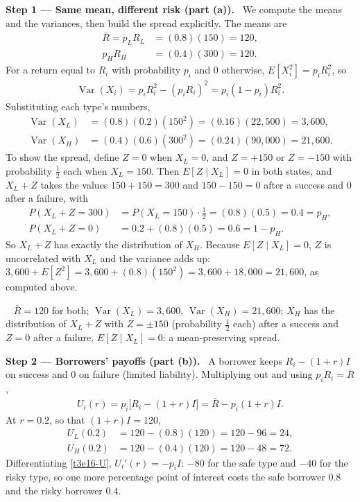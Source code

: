 \documentclass[11pt,a4paper]{article}
\newcommand{\step}[2]{\par\medskip\noindent\textbf{Step #1 --- #2.}~}
\newcommand{\answer}[1]{\par\smallskip\noindent\fbox{\textbf{Answer #1.}}~}
\begin{document}
\step{1}{Same mean, different risk (part (a))} We compute the means and the variances, then build the spread explicitly. The means are
\begin{align}
  \bar R = p_LR_L &= (0.8)(150) = 120, \nonumber\\
  p_HR_H &= (0.4)(300) = 120. \label{t3e16-mean}
\end{align}
For a return equal to $R_i$ with probability $p_i$ and 0 otherwise, $E[X_i^2]=p_iR_i^2$, so
\begin{align}
  \operatorname{Var}(X_i) = p_iR_i^2-(p_iR_i)^2 = p_i(1-p_i)R_i^2. \label{t3e16-var}
\end{align}
Substituting each type's numbers,
\begin{align}
  \operatorname{Var}(X_L) &= (0.8)(0.2)(150^2) = (0.16)(22{,}500) = 3{,}600, \nonumber\\
  \operatorname{Var}(X_H) &= (0.4)(0.6)(300^2) = (0.24)(90{,}000) = 21{,}600. \nonumber
\end{align}
To show the spread, define $Z=0$ when $X_L=0$, and $Z=+150$ or $Z=-150$ with probability $\tfrac12$ each when $X_L=150$. Then $E[Z\mid X_L]=0$ in both states, and $X_L+Z$ takes the values $150+150=300$ and $150-150=0$ after a success and $0$ after a failure, with
\begin{align}
  P(X_L+Z=300) &= P(X_L=150)\cdot\tfrac12 = (0.8)(0.5) = 0.4 = p_H, \nonumber\\
  P(X_L+Z=0) &= 0.2+(0.8)(0.5) = 0.6 = 1-p_H. \nonumber
\end{align}
So $X_L+Z$ has exactly the distribution of $X_H$. Because $E[Z\mid X_L]=0$, $Z$ is uncorrelated with $X_L$ and the variance adds up: $3{,}600+E[Z^2]=3{,}600+(0.8)(150^2)=3{,}600+18{,}000=21{,}600$, as computed above.

\answer{(a)} $\bar R=120$ for both; $\operatorname{Var}(X_L)=3{,}600$, $\operatorname{Var}(X_H)=21{,}600$; $X_H$ has the distribution of $X_L+Z$ with $Z=\pm150$ (probability $\tfrac12$ each) after a success and $Z=0$ after a failure, $E[Z\mid X_L]=0$: a mean-preserving spread.

\step{2}{Borrowers' payoffs (part (b))} A borrower keeps $R_i-(1+r)I$ on success and 0 on failure (limited liability). Multiplying out and using $p_iR_i=\bar R$,
\begin{align}
  U_i(r) = p_i\bigl[R_i-(1+r)I\bigr] = \bar R-p_i(1+r)I. \label{t3e16-U}
\end{align}
At $r=0.2$, so that $(1+r)I=120$,
\begin{align}
  U_L(0.2) &= 120-(0.8)(120) = 120-96 = 24, \nonumber\\
  U_H(0.2) &= 120-(0.4)(120) = 120-48 = 72. \nonumber
\end{align}
Differentiating \eqref{t3e16-U}, $U_i'(r)=-p_iI$: $-80$ for the safe type and $-40$ for the risky type, so one more percentage point of interest costs the safe borrower $0.8$ and the risky borrower $0.4$.
\end{document}
